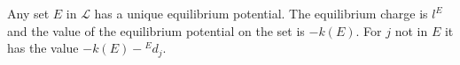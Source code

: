Any set $E$ in $\mathcal{L}$ has a unique equilibrium potential. The equilibrium charge is $l^E$ and the value of the equilibrium potential on the set is $-k(E)$. For $j$ not in $E$ it has the value $-k(E) - {}^E d_j$.
